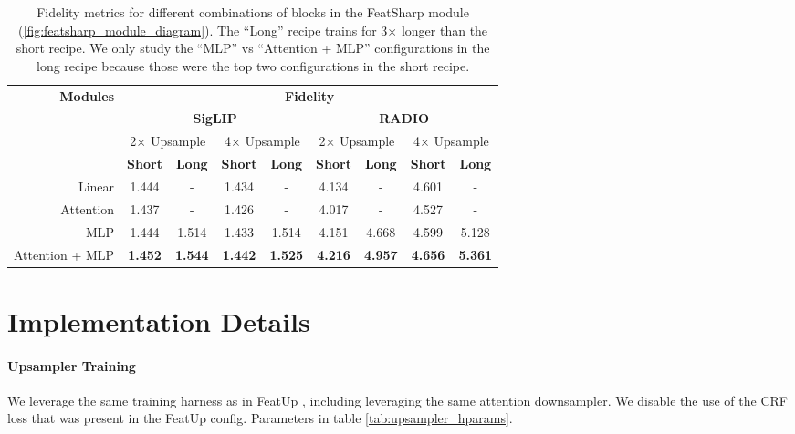 \begin{table}[]
    \centering
    \begin{tabular}{r|cc|cc|cc|cc}
        \multirow{4}{*}{\bf{Modules}} & \multicolumn{8}{c}{\bf{Fidelity}} \\
                        & \multicolumn{4}{c|}{\bf{SigLIP}} & \multicolumn{4}{c}{\bf{RADIO}} \\
                        & \multicolumn{2}{c|}{2$\times$ Upsample} & \multicolumn{2}{c|}{4$\times$ Upsample} & \multicolumn{2}{c|}{2$\times$ Upsample} & \multicolumn{2}{c}{4$\times$ Upsample} \\
                        & \bf{Short}  & \bf{Long}  & \bf{Short} & \bf{Long} & \bf{Short}  & \bf{Long}  & \bf{Short} & \bf{Long}\\
        \hline
        Linear          & 1.444      & -          & 1.434      & -          & 4.134      & -          & 4.601      & -          \\
        Attention       & 1.437      & -          & 1.426      & -          & 4.017      & -          & 4.527      & -          \\
        MLP             & 1.444      & 1.514      & 1.433      & 1.514      & 4.151      & 4.668      & 4.599      & 5.128      \\
        Attention + MLP & \bf{1.452} & \bf{1.544} & \bf{1.442} & \bf{1.525} & \bf{4.216} & \bf{4.957} & \bf{4.656} & \bf{5.361} \\
    \end{tabular}
    \caption{Fidelity metrics for different combinations of blocks in the FeatSharp module (\ref{fig:featsharp_module_diagram}). The ``Long'' recipe trains for 3$\times$ longer than the short recipe. We only study the ``MLP'' vs ``Attention + MLP'' configurations in the long recipe because those were the top two configurations in the short recipe.}
    \label{tab:abl:featsharp_block_arch}
\end{table}

\section{Implementation Details}\label{sec:implementation}

\paragraph{Upsampler Training}
We leverage the same training harness as in FeatUp \citep{fu2024featup}, including leveraging the same attention downsampler. We disable the use of the CRF loss that was present in the FeatUp config. Parameters in table \ref{tab:upsampler_hparams}.

